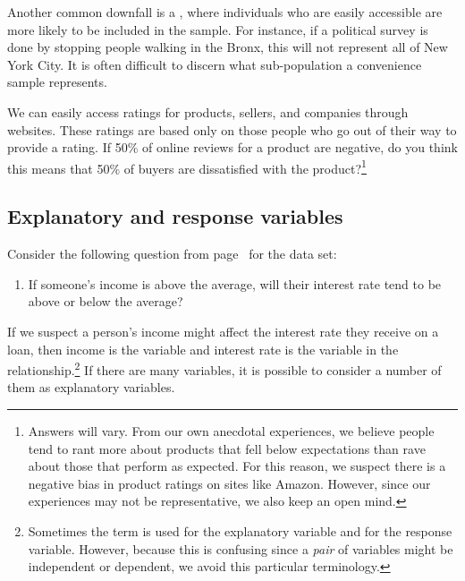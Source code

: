 Another common downfall is a , where individuals who are easily accessible are more likely to be included in the sample. For instance, if a political survey is done by stopping people walking in the Bronx, this will not represent all of New York City. It is often difficult to discern what sub-population a convenience sample represents.

\begin{exercise}
We can easily access ratings for products, sellers, and companies through websites. These ratings are based only on those people who go out of their way to provide a rating. If 50\% of online reviews for a product are negative, do you think this means that 50\% of buyers are dissatisfied with the product?\footnote{Answers will vary. From our own anecdotal experiences, we believe people tend to rant more about products that fell below expectations than rave about those that perform as expected. For this reason, we suspect there is a negative bias in product ratings on sites like Amazon. However, since our experiences may not be representative, we also keep an open mind.}
\end{exercise}


\subsection{Explanatory and response variables}
\label{explanatoryAndResponse}


Consider the following question from
page~\pageref{interest_rate_vs_income}
for the  data set:
\begin{enumerate}
\item[(2)]
    If someone's income is above the average, will their
    interest rate tend to be above or below the average?
\end{enumerate}
If we suspect a person's income might affect the
interest rate they receive on a loan,
then income is the 
variable and interest rate is the
 variable in the
relationship.\footnote{Sometimes the term
 is used for
the explanatory variable and  for
the response variable.
However, because this is confusing since a \emph{pair} of
variables might be independent or dependent, we avoid this
particular terminology.}
If there are many variables, it is possible to consider
a number of them as explanatory variables.

